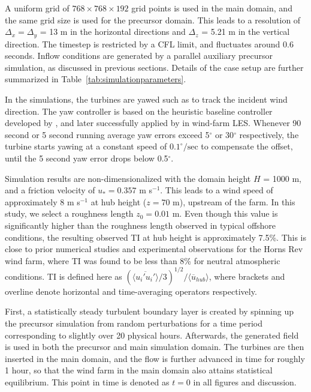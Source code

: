 		A uniform grid of $768 \times 768 \times 192$ grid points is used in the main domain, and the same grid size is used for the precursor domain. This leads to a resolution of $\Delta_x = \Delta_y$ = 13 m in the horizontal directions and $\Delta_z$ = 5.21 m in the vertical direction. The timestep is restricted by a CFL limit, and fluctuates around 0.6 seconds. Inflow conditions are generated by a parallel auxiliary precursor simulation, as discussed in previous sections. Details of the case setup are further summarized in Table~\ref{tab:simulationparameters}.
		
		In the simulations, the turbines are yawed such as to track the incident wind direction. The yaw controller is based on the heuristic baseline controller developed by \cite{kooijman2003dowec}, and later successfully applied by \cite{storey2014modelling} in wind-farm LES. Whenever 90 second or 5 second running average yaw errors exceed 5$^\circ$ or 30$^\circ$ respectively, the turbine starts yawing at a constant speed of $0.1^\circ/\text{sec}$ to compensate the offset, until the 5 second yaw error drops below 0.5$^\circ$.
		
		Simulation results are non-dimensionalized with the domain height $H$ = 1000 m, and a friction velocity of $u_* = 0.357$ m s$^{-1}$. This leads to a wind speed of approximately 8 m s$^{-1}$ at hub height ($z = 70$ m), upstream of the farm. In this study, we select a roughness length $z_0 = 0.01$ m. Even though this value is significantly higher than the roughness length observed in typical offshore conditions, the resulting observed TI at hub height is approximately 7.5\%. This is close to prior numerical studies \citep{porte2013numerical, wu2015modeling} and experimental observations \citep{barthelmie2009modelling, barthelmie2010quantifying} for the Horns Rev wind farm, where TI was found to be less than 8\% for neutral atmospheric conditions. TI is defined here as $(\langle \overline{ u_i' u_i'} \rangle /3)^{1/2} / \langle \overline{u}_{hub} \rangle$, where brackets and overline denote horizontal and time-averaging operators respectively.
		
		First, a statistically steady turbulent boundary layer is created by spinning up the precursor simulation from random perturbations for a time period corresponding to slightly over 20 physical hours. Afterwards, the generated field is used in both the precursor and main simulation domain. The turbines are then inserted in the main domain, and the flow is further advanced in time for roughly 1 hour, so that the wind farm in the main domain also attains statistical equilibrium. This point in time is denoted as  $t = 0$ in all figures and discussion.
		
